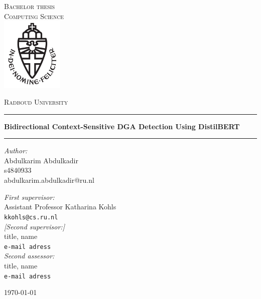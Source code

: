 \documentclass[11pt,a4paper]{report}
\begin{document}
\begin{titlepage}
    \begin{center}
        \textsc{\LARGE Bachelor thesis\\Computing Science}\\[1.5cm]
        \includegraphics[height=100pt]{logo}

        \vspace{0.4cm}
        \textsc{\Large Radboud University}\\[1cm]
        \hrule
        \vspace{0.4cm}
        \textbf{\huge Bidirectional Context-Sensitive DGA Detection Using DistilBERT}\\[0.4cm]
        \hrule
        \vspace{2cm}
        \begin{minipage}[t]{0.45\textwidth}
            \begin{flushleft} \large
                \textit{Author:}\\
                Abdulkarim Abdulkadir\\
                s4840933\\
                abdulkarim.abdulkadir@ru.nl
            \end{flushleft}
        \end{minipage}
        \begin{minipage}[t]{0.45\textwidth}
            \begin{flushright} \large
                \textit{First supervisor:}\\
                Assistant Professor Katharina Kohls\\
                \texttt{kkohls@cs.ru.nl}\\[1.3cm]
                \textit{[Second supervisor:]}\\
                title, name\\
                \texttt{e-mail adress}\\[1.3cm]
                \textit{Second assessor:}\\
                title, name\\
                \texttt{e-mail adress}
            \end{flushright}
        \end{minipage}
        \vfill
        {\large \today}
    \end{center}
\end{titlepage}



\tableofcontents










\appendix

\end{document}

